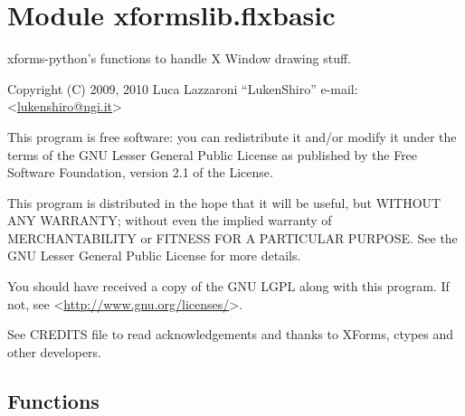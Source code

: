 %
%
%


\section{Module xformslib.flxbasic}

    \label{xformslib:flxbasic}

xforms-python's functions to handle X Window drawing stuff.

Copyright (C) 2009, 2010  Luca Lazzaroni ``LukenShiro''
e-mail: <\href{mailto:lukenshiro@ngi.it}{lukenshiro@ngi.it}>

This program is free software: you can redistribute it and/or modify
it under the terms of the GNU Lesser General Public License as
published by the Free Software Foundation, version 2.1 of the License.

This program is distributed in the hope that it will be useful,
but WITHOUT ANY WARRANTY; without even the implied warranty of
MERCHANTABILITY or FITNESS FOR A PARTICULAR PURPOSE. See the
GNU Lesser General Public License for more details.

You should have received a copy of the GNU LGPL along with this
program. If not, see <\href{http://www.gnu.org/licenses/}{http://www.gnu.org/licenses/}>.

See CREDITS file to read acknowledgements and thanks to XForms,
ctypes and other developers.


  \subsection{Functions}

    \label{xformslib:flxbasic:FL_is_gray}

